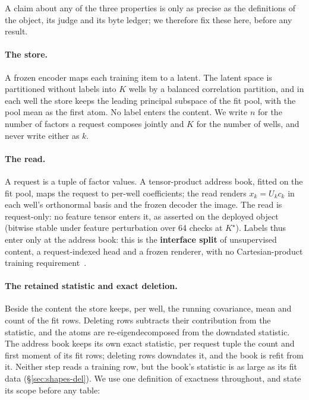 \documentclass{article} %
\newcommand{\Kstar}{\ensuremath{K^{\star}}}
\begin{document}


A claim about any of the three properties is only as precise as the definitions of the object,
its judge and its byte ledger; we therefore fix these here, before any result.

\paragraph{The store.} A frozen encoder maps each training item to a latent. The latent
space is partitioned without labels into $K$ wells by a balanced correlation partition, and in
each well the store keeps the leading principal subspace of the fit pool, with the pool mean as
the first atom. No label enters the content. We write $n$ for the number of factors a request
composes jointly and $K$ for the number of wells, and never write either as $k$.

\paragraph{The read.} A request is a tuple of factor values. A tensor-product address book,
fitted on the fit pool, maps the request to per-well coefficients; the read renders
$x_k=U_k c_k$ in each well's orthonormal basis and the frozen decoder the image.
The read is request-only: no feature tensor enters it, as asserted on the deployed object
(bitwise stable under feature perturbation over 64 checks at $\Kstar$).
Labels thus enter only at the address book: this is the \textbf{interface split} of unsupervised content, a request-indexed head and a frozen renderer, with no
Cartesian-product training requirement~\citep{wiedemer2023compositional,lachapelle2023additive,montero2022lost}.

\paragraph{The retained statistic and exact deletion.} Beside the content the store keeps, per
well, the running covariance, mean and count of the fit rows. Deleting rows subtracts their
contribution from the statistic, and the atoms are re-eigendecomposed from the downdated
statistic. The address book keeps its own exact statistic, per request tuple the count and first
moment of its fit rows; deleting rows downdates it, and the book is refit from it. Neither step
reads a training row, but the book's statistic is as large as its fit data
(\S\ref{sec:shapes-del}). We use one definition of exactness throughout, and state its scope
before any table:
\end{document}
